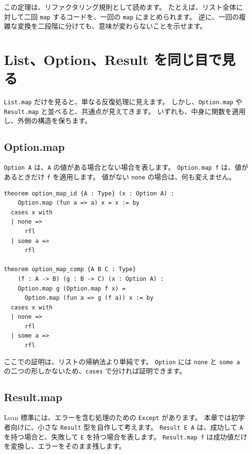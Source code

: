 この定理は、リファクタリング規則として読めます。
たとえば、リスト全体に対して二回 \texttt{map} するコードを、一回の \texttt{map} にまとめられます。
逆に、一回の複雑な変換を二段階に分けても、意味が変わらないことを示せます。

\section{List、Option、Result を同じ目で見る}

\texttt{List.map} だけを見ると、単なる反復処理に見えます。
しかし、\texttt{Option.map} や \texttt{Result.map} と並べると、共通点が見えてきます。
いずれも、中身に関数を適用し、外側の構造を保ちます。

\subsection{Option.map}

\texttt{Option A} は、\texttt{A} の値がある場合とない場合を表します。
\texttt{Option.map f} は、値があるときだけ \texttt{f} を適用します。
値がない \texttt{none} の場合は、何も変えません。

\begin{listing}[htbp]
\begin{verbatim}
theorem option_map_id {A : Type} (x : Option A) :
    Option.map (fun a => a) x = x := by
  cases x with
  | none =>
      rfl
  | some a =>
      rfl

theorem option_map_comp {A B C : Type}
    (f : A -> B) (g : B -> C) (x : Option A) :
    Option.map g (Option.map f x) =
      Option.map (fun a => g (f a)) x := by
  cases x with
  | none =>
      rfl
  | some a =>
      rfl
\end{verbatim}
\caption{\texttt{option\_map\_id} と \texttt{option\_map\_comp}}
\label{lst:ch14_option_map_laws}
\end{listing}

ここでの証明は、リストの帰納法より単純です。
\texttt{Option} には \texttt{none} と \texttt{some a} の二つの形しかないため、\texttt{cases} で分ければ証明できます。

\subsection{Result.map}

Lean 標準には、エラーを含む処理のための \texttt{Except} があります。
本章では初学者向けに、小さな \texttt{Result} 型を自作して考えます。
\texttt{Result E A} は、成功して \texttt{A} を持つ場合と、失敗して \texttt{E} を持つ場合を表します。
\texttt{Result.map f} は成功値だけを変換し、エラーをそのまま残します。


